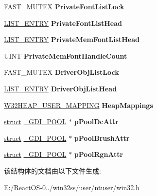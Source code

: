 \begin{DoxyCompactItemize}
\mbox{\label{struct___p_r_o_c_e_s_s_i_n_f_o_a80470fc4db489300fcabaa4611ec08a6}} 
F\+A\+S\+T\+\_\+\+M\+U\+T\+EX {\bfseries Private\+Font\+List\+Lock}
\item 
\mbox{\label{struct___p_r_o_c_e_s_s_i_n_f_o_add3f25dcd0321ab897a367752a06e0c7}} 
\hyperlink{struct___l_i_s_t___e_n_t_r_y}{L\+I\+S\+T\+\_\+\+E\+N\+T\+RY} {\bfseries Private\+Font\+List\+Head}
\item 
\mbox{\label{struct___p_r_o_c_e_s_s_i_n_f_o_a3e75b2420fb15b74fdbc02d926efc932}} 
\hyperlink{struct___l_i_s_t___e_n_t_r_y}{L\+I\+S\+T\+\_\+\+E\+N\+T\+RY} {\bfseries Private\+Mem\+Font\+List\+Head}
\item 
\mbox{\label{struct___p_r_o_c_e_s_s_i_n_f_o_ad91850e9940f254ba0cf773e78acc68f}} 
U\+I\+NT {\bfseries Private\+Mem\+Font\+Handle\+Count}
\item 
\mbox{\label{struct___p_r_o_c_e_s_s_i_n_f_o_acadedb151e8d4a75f970bbd156806a22}} 
F\+A\+S\+T\+\_\+\+M\+U\+T\+EX {\bfseries Driver\+Obj\+List\+Lock}
\item 
\mbox{\label{struct___p_r_o_c_e_s_s_i_n_f_o_ab392ab52e2fd4f33d13c82d07266e804}} 
\hyperlink{struct___l_i_s_t___e_n_t_r_y}{L\+I\+S\+T\+\_\+\+E\+N\+T\+RY} {\bfseries Driver\+Obj\+List\+Head}
\item 
\mbox{\label{struct___p_r_o_c_e_s_s_i_n_f_o_a42a38f8c5b230929cdf2e5d55009cc91}} 
\hyperlink{struct___w32_h_e_a_p___u_s_e_r___m_a_p_p_i_n_g}{W32\+H\+E\+A\+P\+\_\+\+U\+S\+E\+R\+\_\+\+M\+A\+P\+P\+I\+NG} {\bfseries Heap\+Mappings}
\item 
\mbox{\label{struct___p_r_o_c_e_s_s_i_n_f_o_aecec3772805ae61a4b4d5ad4ff578c25}} 
\hyperlink{interfacestruct}{struct} \hyperlink{struct___g_d_i___p_o_o_l}{\+\_\+\+G\+D\+I\+\_\+\+P\+O\+OL} $\ast$ {\bfseries p\+Pool\+Dc\+Attr}
\item 
\mbox{\label{struct___p_r_o_c_e_s_s_i_n_f_o_aa953bc36a8614803b74fb3fd244f747d}} 
\hyperlink{interfacestruct}{struct} \hyperlink{struct___g_d_i___p_o_o_l}{\+\_\+\+G\+D\+I\+\_\+\+P\+O\+OL} $\ast$ {\bfseries p\+Pool\+Brush\+Attr}
\item 
\mbox{\label{struct___p_r_o_c_e_s_s_i_n_f_o_a9660c2b065b97b030857277f1e370dc7}} 
\hyperlink{interfacestruct}{struct} \hyperlink{struct___g_d_i___p_o_o_l}{\+\_\+\+G\+D\+I\+\_\+\+P\+O\+OL} $\ast$ {\bfseries p\+Pool\+Rgn\+Attr}
\end{DoxyCompactItemize}


该结构体的文档由以下文件生成\+:\begin{DoxyCompactItemize}
\item 
E\+:/\+React\+O\+S-\/0../win32ss/user/ntuser/win32.\+h\end{DoxyCompactItemize}
